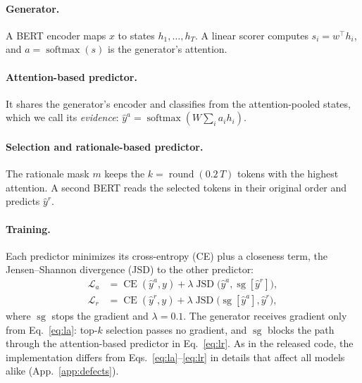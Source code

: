 \documentclass[11pt]{article}
\newcommand{\sg}{\operatorname{sg}}
\newcommand{\JSD}{\operatorname{JSD}}
\newcommand{\CE}{\operatorname{CE}}
\begin{document}
\paragraph{Generator.} A BERT encoder maps $x$ to states $h_1, \dots, h_T$. A linear scorer computes $s_i = w^\top h_i$, and $a = \operatorname{softmax}(s)$ is the generator's attention.

\paragraph{Attention-based predictor.} It shares the generator's encoder and classifies from the attention-pooled states, which we call its \emph{evidence}: $\hat{y}^a = \operatorname{softmax}(W \sum_i a_i h_i)$.

\paragraph{Selection and rationale-based predictor.} The rationale mask $m$ keeps the $k = \operatorname{round}(0.2\,T)$ tokens with the highest attention. A second BERT reads the selected tokens in their original order and predicts $\hat{y}^r$.

\paragraph{Training.} Each predictor minimizes its cross-entropy (CE) plus a closeness term, the Jensen--Shannon divergence (JSD) to the other predictor:
\begin{align}
  \mathcal{L}_a &= \CE(\hat{y}^a, y) + \lambda \JSD\big(\hat{y}^a, \sg[\hat{y}^r]\big), \label{eq:la} \\
  \mathcal{L}_r &= \CE(\hat{y}^r, y) + \lambda \JSD\big(\sg[\hat{y}^a], \hat{y}^r\big), \label{eq:lr}
\end{align}
where $\sg$ stops the gradient and $\lambda = 0.1$. The generator receives gradient only from Eq.~\ref{eq:la}: top-$k$ selection passes no gradient, and $\sg$ blocks the path through the attention-based predictor in Eq.~\ref{eq:lr}. As in the released code, the implementation differs from Eqs.~\ref{eq:la}--\ref{eq:lr} in details that affect all models alike (App.~\ref{app:defects}).
\end{document}
